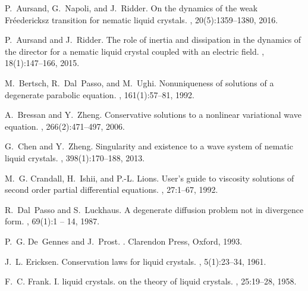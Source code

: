 \documentclass[11pt,leqno]{amsart}
\begin{document}
%
%
\begin{thebibliography}{10}

P.~Aursand, G.~Napoli, and J.~Ridder.
\newblock On the dynamics of the weak {F}r\'{e}edericksz transition for nematic
  liquid crystals.
, 20(5):1359--1380,
  2016.

P.~Aursand and J.~Ridder.
\newblock The role of inertia and dissipation in the dynamics of the director
  for a nematic liquid crystal coupled with an electric field.
, 18(1):147--166, 2015.

M.~Bertsch, R.~Dal~Passo, and M.~Ughi.
\newblock Nonuniqueness of solutions of a degenerate parabolic equation.
, 161(1):57--81, 1992.

A.~Bressan and Y.~Zheng.
\newblock Conservative solutions to a nonlinear variational wave equation.
, 266(2):471--497, 2006.

G.~Chen and Y.~Zheng.
\newblock Singularity and existence to a wave system of nematic liquid
  crystals.
, 398(1):170--188, 2013.

M.~G. Crandall, H.~Ishii, and P.-L. Lions.
\newblock User's guide to viscosity solutions of second order partial
  differential equations.
, 27:1--67, 1992.

R.~Dal~Passo and S.~Luckhaus.
\newblock A degenerate diffusion problem not in divergence form.
, 69(1):1 -- 14, 1987.

P.~G. De~Gennes and J.~Prost.
.
\newblock Clarendon Press, Oxford, 1993.

J.~L. Ericksen.
\newblock Conservation laws for liquid crystals.
, 5(1):23--34, 1961.

F.~C. Frank.
\newblock I. liquid crystals. on the theory of liquid crystals.
, 25:19--28, 1958.


\end{thebibliography}
\end{document}
